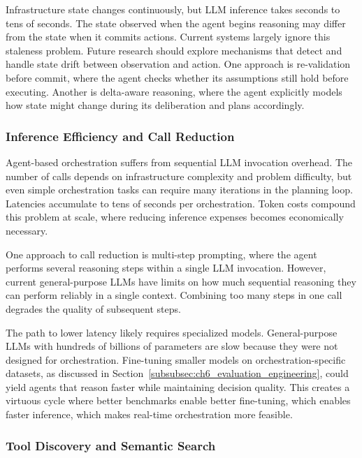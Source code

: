 Infrastructure state changes continuously, but \ac{LLM} inference takes seconds to tens of seconds. The state observed when the agent begins reasoning may differ from the state when it commits actions. Current systems largely ignore this staleness problem. Future research should explore mechanisms that detect and handle state drift between observation and action. One approach is re-validation before commit, where the agent checks whether its assumptions still hold before executing. Another is delta-aware reasoning, where the agent explicitly models how state might change during its deliberation and plans accordingly.

\subsubsection{Inference Efficiency and Call Reduction}
\label{subsubsec:ch6_inference_efficiency}

Agent-based orchestration suffers from sequential \ac{LLM} invocation overhead. The number of calls depends on infrastructure complexity and problem difficulty, but even simple orchestration tasks can require many iterations in the planning loop. Latencies accumulate to tens of seconds per orchestration. Token costs compound this problem at scale, where reducing inference expenses becomes economically necessary.

One approach to call reduction is multi-step prompting, where the agent performs several reasoning steps within a single \ac{LLM} invocation. However, current general-purpose \acp{LLM} have limits on how much sequential reasoning they can perform reliably in a single context. Combining too many steps in one call degrades the quality of subsequent steps.

The path to lower latency likely requires specialized models. General-purpose \acp{LLM} with hundreds of billions of parameters are slow because they were not designed for orchestration. Fine-tuning smaller models on orchestration-specific datasets, as discussed in Section~\ref{subsubsec:ch6_evaluation_engineering}, could yield agents that reason faster while maintaining decision quality. This creates a virtuous cycle where better benchmarks enable better fine-tuning, which enables faster inference, which makes real-time orchestration more feasible.

\subsubsection{Tool Discovery and Semantic Search}
\label{subsubsec:ch6_tool_discovery}

